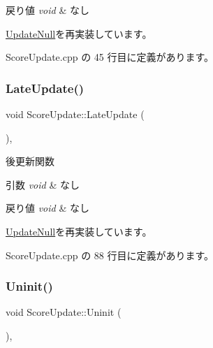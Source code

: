 \begin{DoxyRetVals}{戻り値}
{\em void} & なし \\
\hline
\end{DoxyRetVals}


\mbox{\hyperlink{class_update_null_abe9bc57c7932d2de47073c2709007432}{Update\+Null}}を再実装しています。



 Score\+Update.\+cpp の 45 行目に定義があります。

\mbox{\label{class_score_update_adc9a48f54828e49c072c298777935893}} 
\subsubsection{\texorpdfstring{Late\+Update()}{LateUpdate()}}
{\footnotesize\ttfamily void Score\+Update\+::\+Late\+Update (\begin{DoxyParamCaption}{ }\end{DoxyParamCaption})\hspace{0.3cm}{\ttfamily [override]}, {\ttfamily [virtual]}}



後更新関数 


\begin{DoxyParams}{引数}
{\em void} & なし \\
\hline
\end{DoxyParams}

\begin{DoxyRetVals}{戻り値}
{\em void} & なし \\
\hline
\end{DoxyRetVals}


\mbox{\hyperlink{class_update_null_ac68da1ba7f3fbcae833442bb1c169200}{Update\+Null}}を再実装しています。



 Score\+Update.\+cpp の 88 行目に定義があります。

\mbox{\label{class_score_update_a701d9c84c3ef92b1c54f33b37e23605f}} 
\subsubsection{\texorpdfstring{Uninit()}{Uninit()}}
{\footnotesize\ttfamily void Score\+Update\+::\+Uninit (\begin{DoxyParamCaption}{ }\end{DoxyParamCaption})\hspace{0.3cm}{\ttfamily [override]}, {\ttfamily [virtual]}}



